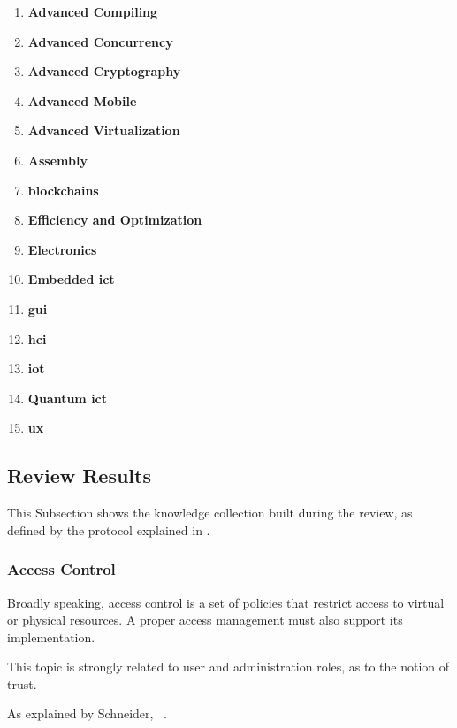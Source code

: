 \begin{enumerate}
    \setlength\itemsep{-0.5em}
    \item \textbf{Advanced Compiling}
    \item \textbf{Advanced Concurrency}
    \item \textbf{Advanced Cryptography}
    \item \textbf{Advanced Mobile}
    \item \textbf{Advanced Virtualization}
    \item \textbf{Assembly}
    \item \textbf{\Glspl{blockchain}}
    \item \textbf{Efficiency and Optimization}
    \item \textbf{Electronics}
    \item \textbf{Embedded \gls{ict}}
    \item \textbf{\gls{gui}}
    \item \textbf{\gls{hci}}
    \item \textbf{\gls{iot}}
    \item \textbf{Quantum \gls{ict}}
    \item \textbf{\gls{ux}}
\end{enumerate}

\subsection{Review Results}
\label{subsec:state_review_results}

This Subsection shows the knowledge collection built during the review, as defined by the protocol explained in .

\subsubsection{Access Control}
\label{subsubsec:state_review_results_accesscontrol}

Broadly speaking, access control is a set of policies that restrict access to virtual or physical resources. A proper access management must also support its implementation.

This topic is strongly related to user and administration roles, as to the notion of trust.

As explained by Schneider, ~\cite{schneider_least_2003}.

